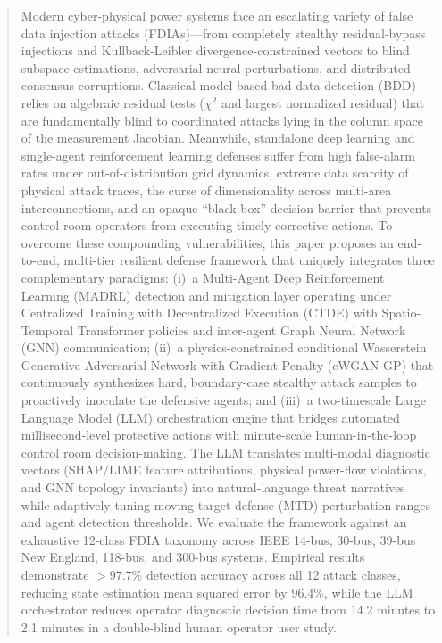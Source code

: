 \documentclass[journal,compsoc]{IEEEtran}
\begin{document}
\begin{abstract}
Modern cyber-physical power systems face an escalating variety of false data injection attacks (FDIAs)---from completely stealthy residual-bypass injections and Kullback-Leibler divergence-constrained vectors to blind subspace estimations, adversarial neural perturbations, and distributed consensus corruptions. Classical model-based bad data detection (BDD) relies on algebraic residual tests ($\chi^2$ and largest normalized residual) that are fundamentally blind to coordinated attacks lying in the column space of the measurement Jacobian. Meanwhile, standalone deep learning and single-agent reinforcement learning defenses suffer from high false-alarm rates under out-of-distribution grid dynamics, extreme data scarcity of physical attack traces, the curse of dimensionality across multi-area interconnections, and an opaque ``black box'' decision barrier that prevents control room operators from executing timely corrective actions. To overcome these compounding vulnerabilities, this paper proposes an end-to-end, multi-tier resilient defense framework that uniquely integrates three complementary paradigms: (i)~a Multi-Agent Deep Reinforcement Learning (MADRL) detection and mitigation layer operating under Centralized Training with Decentralized Execution (CTDE) with Spatio-Temporal Transformer policies and inter-agent Graph Neural Network (GNN) communication; (ii)~a physics-constrained conditional Wasserstein Generative Adversarial Network with Gradient Penalty (cWGAN-GP) that continuously synthesizes hard, boundary-case stealthy attack samples to proactively inoculate the defensive agents; and (iii)~a two-timescale Large Language Model (LLM) orchestration engine that bridges automated millisecond-level protective actions with minute-scale human-in-the-loop control room decision-making. The LLM translates multi-modal diagnostic vectors (SHAP/LIME feature attributions, physical power-flow violations, and GNN topology invariants) into natural-language threat narratives while adaptively tuning moving target defense (MTD) perturbation ranges and agent detection thresholds. We evaluate the framework against an exhaustive 12-class FDIA taxonomy across IEEE 14-bus, 30-bus, 39-bus New England, 118-bus, and 300-bus systems. Empirical results demonstrate $>97.7\%$ detection accuracy across all 12 attack classes, reducing state estimation mean squared error by $96.4\%$, while the LLM orchestrator reduces operator diagnostic decision time from 14.2 minutes to 2.1 minutes in a double-blind human operator user study.
\end{abstract}
\end{document}
